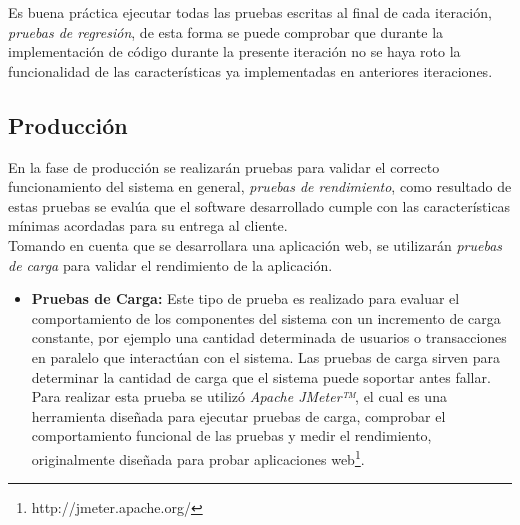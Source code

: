               Es buena práctica ejecutar todas las pruebas escritas al final de cada iteración, \emph{pruebas de regresión}, de esta forma se puede comprobar que durante la implementación de código durante la presente iteración no se haya roto la funcionalidad de las características ya implementadas en anteriores iteraciones. \cite[p. 25]{metodosAgiles}





          \subsection{Producción}
          \label{sub:produccion}

          En la fase de producción se realizarán pruebas para validar el correcto funcionamiento del sistema en general, \emph{pruebas de rendimiento}, como resultado de estas pruebas se evalúa que el software desarrollado cumple con las características mínimas acordadas para su entrega al cliente. \cite[p. 139]{casosPruebaUmss} \\



         Tomando en cuenta que se desarrollara una aplicación web, se utilizarán \emph{pruebas de carga} para validar el rendimiento de la aplicación.

         \begin{itemize}
           \item \textbf{Pruebas de Carga:} Este tipo de prueba es realizado para evaluar el comportamiento de los componentes del sistema con un incremento de carga constante, por ejemplo una cantidad determinada de usuarios o transacciones en paralelo que interactúan con el sistema. Las pruebas de carga sirven para determinar la cantidad de carga que el sistema puede soportar antes fallar. \cite{glosarioTesting} \\

           Para realizar esta prueba se utilizó \emph{Apache JMeter™}, el cual es una herramienta diseñada para ejecutar pruebas de carga, comprobar el comportamiento funcional de las pruebas y medir el rendimiento, originalmente diseñada para probar aplicaciones web\footnote{http://jmeter.apache.org/}.

           \end{itemize}

